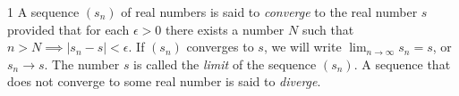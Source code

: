 \begin{defn}{1}
	A sequence $(s_n)$ of real numbers is said to \textit{converge} to the real number $s$ provided that for each $\epsilon > 0$ there exists a number $N$	such that $n > N \implies |s_n-s|<\epsilon$. If $(s_n)$ converges to $s$, we will write $\lim_{n\rightarrow\infty} s_n = s$, or $s_n \rightarrow s$. The	number $s$ is called the \textit{limit} of the sequence $(s_n)$. A sequence that does not converge to some real number is said to \textit{diverge}.
\end{defn}




